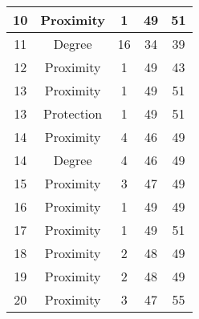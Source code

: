 \documentclass[results.tex]{subfiles}
\begin{document}
\begin{center}
\begin{tabular}{| c || c | c | c | c |}
            \hline
            10                      & Proximity                    & 1                      & 49                      & 51                   \\
            \hline
            11                      & Degree                       & 16                     & 34                      & 39                   \\
            \hline
            12                      & Proximity                    & 1                      & 49                      & 43                   \\
            \hline
            13                      & Proximity                    & 1                      & 49                      & 51                   \\
            \hline
            13                      & Protection                   & 1                      & 49                      & 51                   \\
            \hline
            14                      & Proximity                    & 4                      & 46                      & 49                   \\
            \hline
            14                      & Degree                       & 4                      & 46                      & 49                   \\
            \hline
            15                      & Proximity                    & 3                      & 47                      & 49                   \\
            \hline
            16                      & Proximity                    & 1                      & 49                      & 49                   \\
            \hline
            17                      & Proximity                    & 1                      & 49                      & 51                   \\
            \hline
            18                      & Proximity                    & 2                      & 48                      & 49                   \\
            \hline
            19                      & Proximity                    & 2                      & 48                      & 49                   \\
            \hline
            20                      & Proximity                    & 3                      & 47                      & 55                   \\

\end{tabular}
\end{center}
\end{document}
